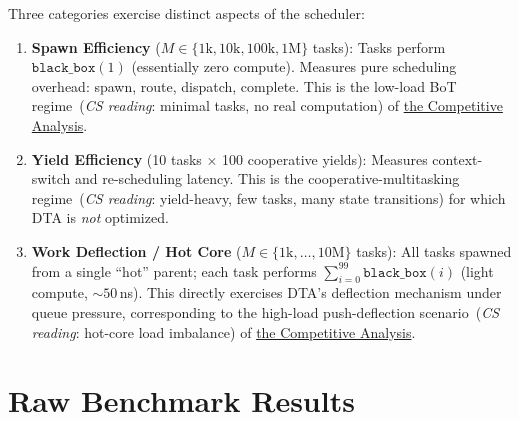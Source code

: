 \documentclass[11pt,a4paper]{article}
\newcommand{\physics}[2]{#1\ \textnormal{(\emph{CS reading}: #2)}}
\newcommand{\dtact}{\textsc{DTA}}
\begin{document}
Three categories exercise distinct aspects of the scheduler:

\begin{enumerate}
  \item \textbf{Spawn Efficiency} ($M \in \{1\mathrm{k}, 10\mathrm{k},
        100\mathrm{k}, 1\mathrm{M}\}$ tasks):
        Tasks perform $\texttt{black\_box}(1)$ (essentially zero compute).
        Measures pure scheduling overhead: spawn, route, dispatch, complete.
        This is the \physics{low-load BoT regime}{minimal tasks, no real computation}
        of \hyperref[chap:competitive_ratio]{the Competitive Analysis}.

  \item \textbf{Yield Efficiency} (10 tasks $\times$ 100 cooperative yields):
        Measures context-switch and re-scheduling latency.
        This is the \physics{cooperative-multitasking regime}{yield-heavy,
        few tasks, many state transitions} for which \dtact{} is
        \emph{not} optimized.

  \item \textbf{Work Deflection / Hot Core} ($M \in \{1\mathrm{k}, \ldots,
        10\mathrm{M}\}$ tasks):
        All tasks spawned from a single ``hot'' parent; each task performs
        $\sum_{i=0}^{99} \texttt{black\_box}(i)$ (light compute, $\sim\!50$\,ns).
        This directly exercises DTA's deflection mechanism under queue
        pressure, corresponding to the \physics{high-load push-deflection
        scenario}{hot-core load imbalance} of \hyperref[chap:competitive_ratio]{the Competitive Analysis}.
\end{enumerate}

\section{Raw Benchmark Results}
\end{document}
